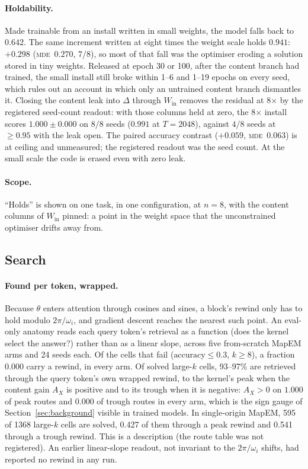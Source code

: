 \documentclass[10pt]{article}
\newcommand{\mde}{\textsc{mde}}
\begin{document}
\paragraph{Holdability.} Made trainable from an install written in small weights, the model falls back
to $0.642$. The same increment written at eight times the weight scale holds $0.941$: $+0.298$ (\mde\
$0.270$, $7/8$), so most of that fall was the optimiser eroding a solution stored in tiny weights. Released
at epoch 30 or 100, after the content branch had trained, the small install still broke within 1--6 and
1--19 epochs on every seed, which rules out an account in which only an untrained content branch
dismantles it. Closing the content leak into $\Delta$ through $W_{\mathrm{in}}$ removes the residual at 8$\times$
by the registered seed-count readout: with
those columns held at zero, the 8$\times$ install scores $1.000\pm0.000$ on $8/8$ seeds ($0.991$ at
$T=2048$), against $4/8$ seeds at $\ge0.95$ with the leak open. The paired accuracy contrast ($+0.059$,
\mde\ $0.063$) is at ceiling and unmeasured; the registered readout was the seed count. At the small
scale the code is erased even with zero leak. %

\paragraph{Scope.} ``Holds'' is shown on one task, in one configuration, at $n=8$, with the content
columns of $W_{\mathrm{in}}$ pinned: a point in the weight space that the unconstrained optimiser drifts
away from.

\subsection{Search}
\label{sec:c4-search}

\paragraph{Found per token, wrapped.} Because $\theta$ enters attention through cosines and sines, a block's
rewind only has to hold modulo $2\pi/\omega_i$, and gradient descent reaches the nearest such point. An
eval-only anatomy reads each query token's retrieval as a function (does the kernel select the answer?)
rather than as a linear slope, across five from-scratch MapEM arms and 24 seeds each. Of the cells that
fail ($\text{accuracy}\le0.3$, $k\ge8$), a fraction $0.000$ carry a rewind, in every arm. Of solved large-$k$
cells, 93--97\% are retrieved through the query token's own wrapped rewind, to the kernel's peak when the
content gain $A_X$ is positive and to its trough when it is negative: $A_X>0$ on $1.000$ of peak routes and
$0.000$ of trough routes in every arm, which is the sign gauge of Section~\ref{sec:background} visible in
trained models. In single-origin MapEM, 595 of 1368 large-$k$ cells are solved, 0.427 of them through a
peak rewind and 0.541 through a trough rewind. This is a description (the route table was not
registered). An earlier linear-slope readout, not invariant to the $2\pi/\omega_i$ shifts, had reported no
rewind in any run. %
\end{document}
